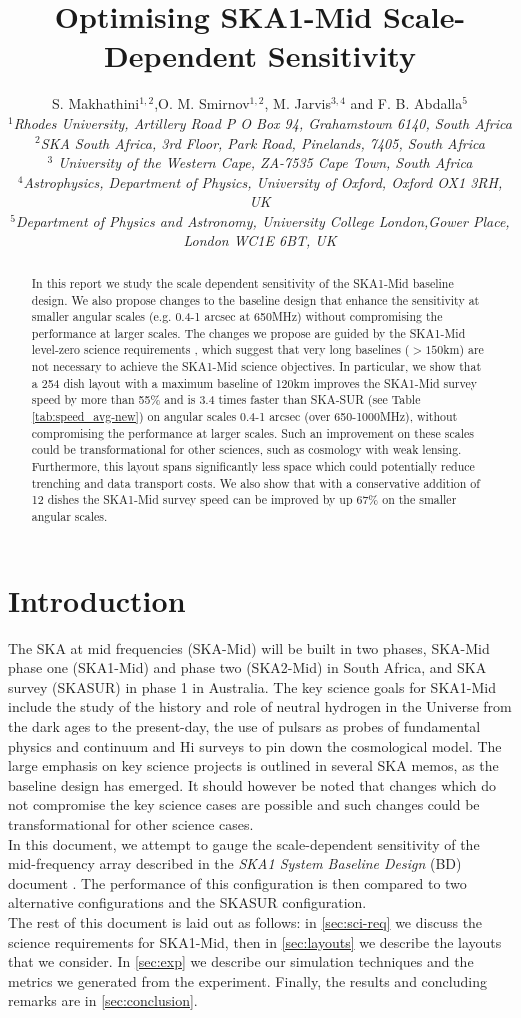 \documentclass[sfheadings,a4paper,times,9pt,floats,floatfix]{article}
\title{Optimising SKA1-Mid Scale-Dependent Sensitivity}
\author{S. Makhathini$^{1,2}$,O. M. Smirnov$^{1,2}$, M. Jarvis$^{3,4}$ and F. B. Abdalla$^5$ \\{\footnotesize \it $^1$Rhodes
University, Artillery Road P O Box 94, Grahamstown 6140, South Africa} \\{ \footnotesize \it $^2$SKA South Africa, 3rd Floor,
Park Road, Pinelands, 7405, South Africa} \\{\footnotesize \it $^3$ University of the Western Cape, ZA-7535 Cape Town, South
Africa}\\ {\footnotesize \it $^4$Astrophysics, Department of Physics, University of Oxford, Oxford OX1 3RH, UK} \\ {\footnotesize \it $^5$Department of Physics
and Astronomy, University College London,Gower Place, London WC1E 6BT, UK}}
\begin{document}
\maketitle
\begin{abstract}
In this report we study the scale dependent sensitivity of the SKA1-Mid baseline design. We also propose changes to the baseline
design that enhance the sensitivity at smaller angular scales (e.g. 0.4-1 arcsec at 650MHz) without compromising the performance
at larger scales. The changes we propose are guided by the SKA1-Mid level-zero science requirements \cite{srd}, which suggest that
very long baselines ($>150$km) are not necessary to achieve the SKA1-Mid science objectives. In particular, we show that a 254
dish layout with a maximum baseline of 120km improves the SKA1-Mid survey speed by more than 55\% and is 3.4 times faster than
SKA-SUR (see Table \ref{tab:speed_avg-new}) on angular scales 0.4-1 arcsec (over 650-1000MHz), without compromising the
performance
at larger scales. Such an improvement on these scales could be transformational for other sciences, such as cosmology with weak
lensing. Furthermore, this layout spans significantly less space which could potentially reduce trenching and data transport
costs. We also show that with a conservative addition of 12 dishes the SKA1-Mid survey speed can be improved by up 67\% on the
smaller angular scales.
\end{abstract}
\section{Introduction}
The SKA at mid frequencies (SKA-Mid) will be built in two phases, SKA-Mid phase one (SKA1-Mid) and phase two (SKA2-Mid)
in South Africa, and SKA survey (SKASUR) in phase 1 in Australia. The key science goals for SKA1-Mid include the study of the
history and role of neutral hydrogen in the Universe from the dark ages to the present-day, the use of pulsars as probes of
fundamental physics \cite{bd} and continuum and H{\sc i} surveys to pin down the cosmological model. The large emphasis on key
science projects is outlined in several SKA memos, as the baseline design has emerged. It should however be noted that changes
which do not compromise the key science cases are possible and such changes could be transformational for other science 
cases. \\ In this document, we attempt to gauge the scale-dependent sensitivity of the mid-frequency array
described in the {\it SKA1 System Baseline Design} (BD) document \cite{bd}. The performance of this configuration is then compared
to two alternative configurations and the SKASUR configuration.\\
The rest of this document is laid out as follows: in \autoref{sec:sci-req} we discuss the science requirements for SKA1-Mid, then
in \autoref{sec:layouts} we describe the layouts that we consider. In \autoref{sec:exp} we describe our simulation
techniques and the metrics we generated from the experiment. Finally, the results and concluding remarks are in
\autoref{sec:conclusion}.
\end{document}
